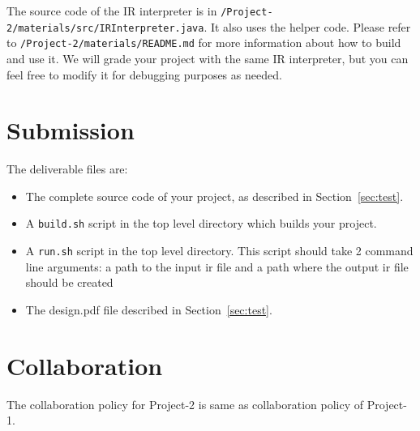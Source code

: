 \documentclass[12pt]{article}
\begin{document}
The source code of the IR interpreter is in \texttt{/Project-2/materials/src/IRInterpreter.java}.
It also uses the helper code.
Please refer to \texttt{/Project-2/materials/README.md} for more information about how to build and use it.
We will grade your project with the same IR interpreter, but you can
feel free to modify it for debugging purposes as needed.

\section{Submission}

The deliverable files are:
\begin{itemize}
    \item The complete source code of your project, as described in Section~\ref{sec:test}.
    \item A \texttt{build.sh} script in the top level directory which builds your project.
    \item A \texttt{run.sh} script in the top level directory. This script should take 2 command line arguments: a path to the input ir file and a path where the output ir file should be created

    \item The design.pdf file described in Section~\ref{sec:test}.
\end{itemize}

\section{Collaboration}
The collaboration policy for Project-2 is same as collaboration policy of Project-1.
\end{document}
